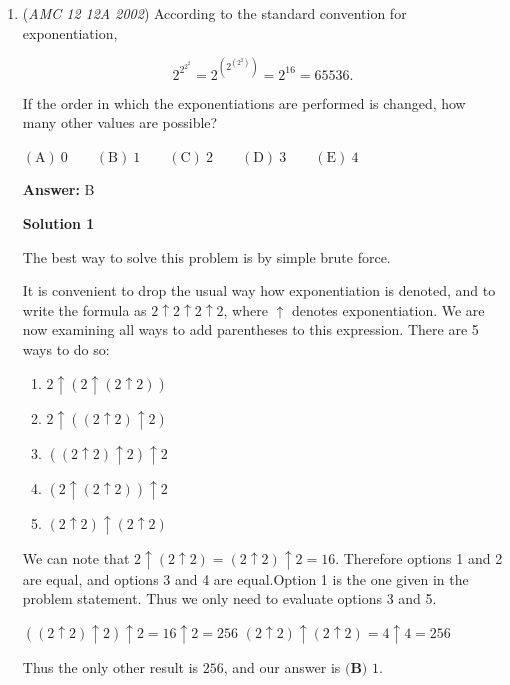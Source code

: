 \begin{enumerate}
\textbf{Solution 2}

Let the number be $x$. We transform the problem into an equation: $\frac{x-9}{3}=43$. Solve for $x$ gives us $x=138$. Therefore, the correct result is $\frac{138-3}{9}=\frac{135}{9}=\boxed{\textbf{(A) }15}$.

 


	\item (\textit{AMC 12 12A 2002}) According to the standard convention for exponentiation, 

 \[2^{2^{2^{2}}} = 2^{\left(2^{\left(2^2\right)}\right)} = 2^{16} = 65536.\]


 If the order in which the exponentiations are performed is changed, how many other values are possible?


 $\mathrm{(A) \ } 0\qquad \mathrm{(B) \ } 1\qquad \mathrm{(C) \ } 2\qquad \mathrm{(D) \ } 3\qquad \mathrm{(E) \ } 4$

 \textbf{Answer: }B



\textbf{Solution 1}

The best way to solve this problem is by simple brute force. 

 It is convenient to drop the usual way how exponentiation is denoted, and to write the formula as $2\uparrow 2\uparrow 2\uparrow 2$, where $\uparrow$ denotes exponentiation. We are now examining all ways to add parentheses to this expression. There are 5 ways to do so:

 
            \begin{enumerate}
        \item $2\uparrow (2\uparrow (2\uparrow 2))$
        \item $2\uparrow ((2\uparrow 2)\uparrow 2)$
        \item $((2\uparrow 2)\uparrow 2)\uparrow 2$
        \item $(2\uparrow (2\uparrow 2))\uparrow 2$
        \item $(2\uparrow 2)\uparrow (2\uparrow 2)$
            \end{enumerate}
            We can note that $2\uparrow (2\uparrow 2) = (2\uparrow 2)\uparrow 2 =16$. Therefore options 1 and 2 are equal, and options 3 and 4 are equal.Option 1 is the one given in the problem statement. Thus we only need to evaluate options 3 and 5.

 $((2\uparrow 2)\uparrow 2)\uparrow 2 = 16\uparrow 2 = 256$
$(2\uparrow 2)\uparrow (2\uparrow 2) = 4 \uparrow 4 = 256$

 Thus the only other result is $256$, and our answer is $\boxed{\textbf{(B) } 1}$.


\end{enumerate}
